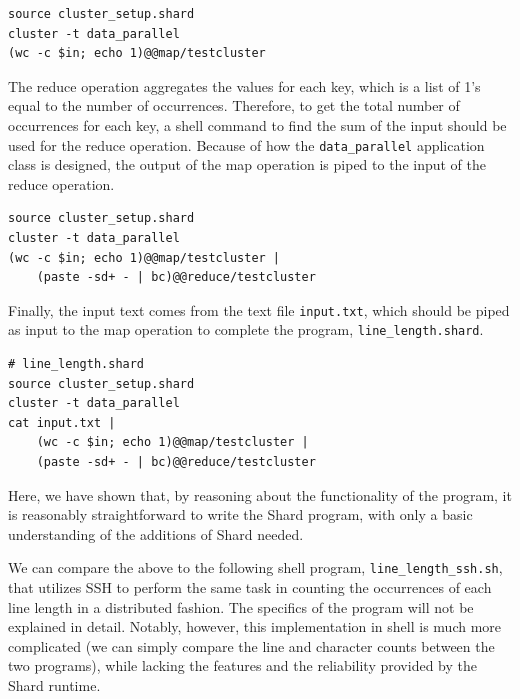 \documentclass[oneside]{report}
\begin{document}
\begin{minipage}[c]{\textwidth-15pt}
  \begin{lstlisting}[language=Shard]
source cluster_setup.shard
cluster -t data_parallel
(wc -c $in; echo 1)@@map/testcluster
\end{lstlisting}
  \smallskip
\end{minipage}

The reduce operation aggregates the values for each key, which is a list of 1's equal to the number of occurrences.
Therefore, to get the total number of occurrences for each key, a shell command to find the sum of the input should be used for the reduce operation.
Because of how the \texttt{data\_parallel} application class is designed, the output of the map operation is piped to the input of the reduce operation.

\begin{minipage}[c]{\textwidth-15pt}
  \begin{lstlisting}[language=Shard]
source cluster_setup.shard
cluster -t data_parallel
(wc -c $in; echo 1)@@map/testcluster |
    (paste -sd+ - | bc)@@reduce/testcluster
\end{lstlisting}
  \smallskip
\end{minipage}

Finally, the input text comes from the text file \texttt{input.txt}, which should be piped as input to the map operation to complete the program, \texttt{line\_length.shard}.

\begin{minipage}[c]{\textwidth-15pt}
  \begin{lstlisting}[language=Shard]
# line_length.shard
source cluster_setup.shard
cluster -t data_parallel
cat input.txt |
    (wc -c $in; echo 1)@@map/testcluster |
    (paste -sd+ - | bc)@@reduce/testcluster
\end{lstlisting}
  \smallskip
\end{minipage}

Here, we have shown that, by reasoning about the functionality of the program, it is reasonably straightforward to write the Shard program, with only a basic understanding of the additions of Shard needed.

We can compare the above to the following shell program, \texttt{line\_length\_ssh.sh}, that utilizes SSH to perform the same task in counting the occurrences of each line length in a distributed fashion.
The specifics of the program will not be explained in detail.
Notably, however, this implementation in shell is much more complicated (we can simply compare the line and character counts between the two programs), while lacking the features and the reliability provided by the Shard runtime.
\end{document}
